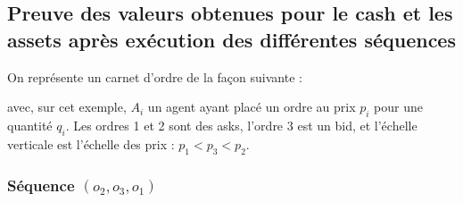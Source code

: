 \documentclass[a4paper]{article}
\newtheorem[style=S, bodystyle=\noindent]{thm}{Théorème}[section]
\newtheorem[style=S, bodystyle=\noindent]{defn}[thm]{Définition}
\newtheorem[style=S, bodystyle=\noindent]{propo}[thm]{Proposition}
\newtheorem[style=S, bodystyle=\noindent]{prop}[thm]{Propriété}
\newtheorem[style=S, bodystyle=\noindent]{coro}[thm]{Corollaire}
\newtheorem[style=S, bodystyle=\noindent]{lem}[thm]{Lemme}
\newtheorem[style=S, headstyle=\bfseries\boldmath Théorème, bodystyle=\noindent]{thm*}{Théorème}
\newtheorem[style=S, headstyle=\bfseries\boldmath Définition, bodystyle=\noindent]{defn*}{Définition}
\newtheorem[style=S, headstyle=\bfseries\boldmath Proposition, bodystyle=\noindent]{propo*}{Proposition}
\newtheorem[style=S, headstyle=\bfseries\boldmath Propriété, bodystyle=\noindent]{prop*}{Propriété}
\newtheorem[style=S, headstyle=\bfseries\boldmath Corollaire, bodystyle=\noindent]{coro*}{Corollaire}
\newtheorem[style=S, headstyle=\bfseries\boldmath Lemme, bodystyle=\noindent]{lem*}{Lemme}
\begin{document}
\subsection{Preuve des valeurs obtenues pour le cash et les assets après exécution des différentes séquences}
\label{appendix2}

\par
On représente un carnet d'ordre de la façon suivante :
\begin{center}
\end{center}
avec, sur cet exemple, $A_i$ un agent ayant placé un ordre au prix $p_i$ pour une quantité $q_i$. Les ordres 1 et 2 sont des asks, l'ordre 3 est un bid, et l'échelle verticale est l'échelle des prix : $p_1 < p_3 < p_2$.

\subsubsection{Séquence $(o_2,o_3,o_1)$}
\end{document}
